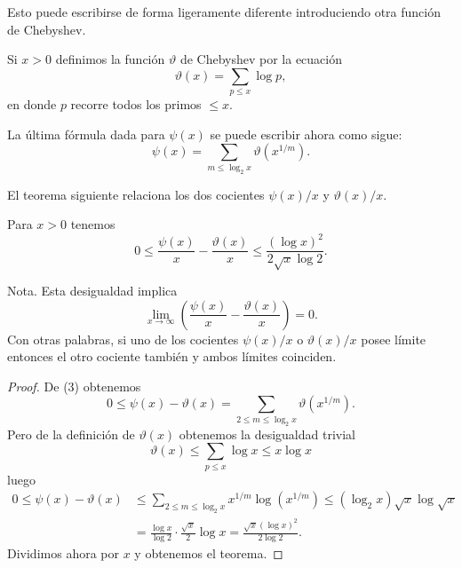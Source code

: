 \documentclass[12pt,a4paper]{book}
\begin{document}
    Esto puede escribirse de forma ligeramente diferente introduciendo otra función
    de Chebyshev.

    \begin{definicion}\label{sim:theta}
        Si $x>0$ definimos la función $\vartheta$ de Chebyshev por la ecuación
        \begin{equation*}
            \vartheta(x)=\sum_{p\leq x}\log p,
        \end{equation*}
        en donde $p$ recorre todos los primos $\leq x$.
    \end{definicion}

    La última fórmula dada para $\psi(x)$ se puede escribir ahora como sigue:
    \begin{equation}
        \psi(x)=\sum_{m\leq\log_{2}x}\vartheta(x^{1/m}).
    \end{equation}

    El teorema siguiente relaciona los dos cocientes $\psi(x)/x$ y $\vartheta(x)/x$.

    \begin{teorema}
        Para $x>0$ tenemos
        \begin{equation*}
            0\leq\frac{\psi(x)}{x}-\frac{\vartheta(x)}{x}\leq\frac{(\log x)^{2}}{2\sqrt{x}\log2}.
        \end{equation*}
    \end{teorema}

    Nota. Esta desigualdad implica
    \begin{equation*}
        \lim_{x\to\infty}\left(\frac{\psi(x)}{x}-\frac{\vartheta(x)}{x}\right)=0.
    \end{equation*}
    Con otras palabras, si uno de los cocientes $\psi(x)/x$ o $\vartheta(x)/x$ posee
    límite entonces el otro cociente también y ambos límites coinciden.

    \begin{proof}
        De (3) obtenemos
        \begin{equation*}
            0\leq\psi(x)-\vartheta(x)=\sum_{2\leq m\leq\log_{2}x}\vartheta(x^{1/m}).
        \end{equation*}
        Pero de la definición de $\vartheta(x)$ obtenemos la desigualdad trivial
        \begin{equation*}
            \vartheta(x)\leq\sum_{p\leq x}\log x\leq x\log x
        \end{equation*}
        luego
        \begin{align*}
            0\leq\psi(x)-\vartheta(x)&\leq\sum_{2\leq m\leq\log_{2}x}x^{1/m}\log(x^{1/m})
            \leq(\log_{2}x)\sqrt{x}\log\sqrt{x}\\
            &=\frac{\log x}{\log2}\cdot\frac{\sqrt{x}}{2}\log x=\frac{\sqrt{x}(\log x)^{2}}{2\log2}.
        \end{align*}
        Dividimos ahora por $x$ y obtenemos el teorema.
    \end{proof}
\end{document}
